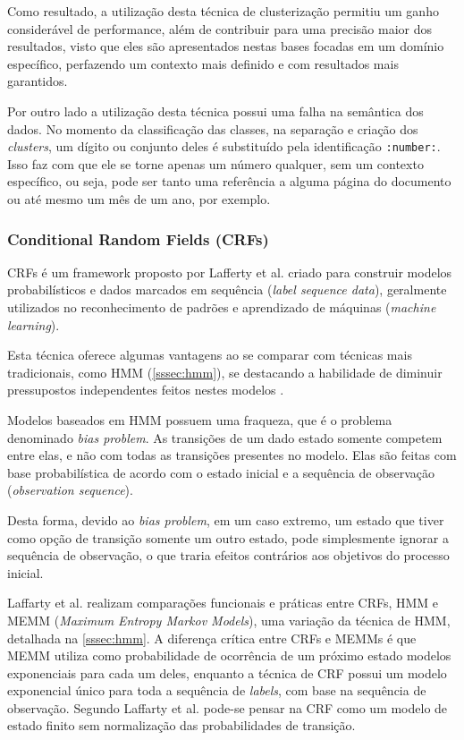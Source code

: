 Como resultado, a utilização desta técnica de clusterização permitiu um ganho considerável de performance, além de contribuir para uma precisão maior dos resultados, visto que eles são apresentados nestas bases focadas em um domínio específico, perfazendo um contexto mais definido e com resultados mais garantidos.

Por outro lado a utilização desta técnica possui uma falha na semântica dos dados. No momento da classificação das classes, na separação e criação dos \textit{clusters}, um dígito ou conjunto deles é substituído pela identificação \texttt{:number:}. Isso faz com que ele se torne apenas um número qualquer, sem um contexto específico, ou seja, pode ser tanto uma referência a alguma página do documento ou até mesmo um mês de um ano, por exemplo.


\subsubsection{Conditional Random Fields (CRFs)}
\label{sssec:crf}


CRFs é um framework proposto por Lafferty et al. \cite{Lafferty-CRF} criado para construir modelos probabilísticos e dados marcados em sequência (\textit{label sequence data}), geralmente utilizados no reconhecimento de padrões e aprendizado de máquinas (\textit{machine learning}).

Esta técnica oferece algumas vantagens ao se comparar com técnicas mais tradicionais, como HMM (\autoref{sssec:hmm}), se destacando a habilidade de diminuir pressupostos independentes feitos nestes modelos \cite{Lafferty-CRF}.

Modelos baseados em HMM possuem uma fraqueza, que é o problema denominado \textit{bias problem}. As transições de um dado estado somente competem entre elas, e não com todas as transições presentes no modelo. Elas são feitas com base probabilística de acordo com o estado inicial e a sequência de observação (\textit{observation sequence}).

Desta forma, devido ao \textit{bias problem}, em um caso extremo, um estado que tiver como opção de transição somente um outro estado, pode simplesmente ignorar a sequência de observação, o que traria efeitos contrários aos objetivos do processo inicial.

Laffarty et al. realizam comparações funcionais e práticas entre CRFs, HMM e MEMM (\textit{Maximum Entropy Markov Models}), uma variação da técnica de HMM, detalhada na \autoref{sssec:hmm}. A diferença crítica entre CRFs e MEMMs é que MEMM utiliza como probabilidade de ocorrência de um próximo estado modelos exponenciais para cada um deles, enquanto a técnica de CRF possui um modelo exponencial único para toda a sequência de \textit{labels}, com base na sequência de observação. Segundo Laffarty et al. \cite{Lafferty-CRF} pode-se pensar na CRF como um modelo de estado finito sem normalização das probabilidades de transição.

